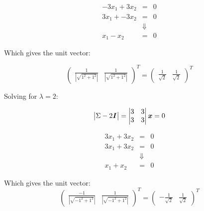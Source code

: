 \documentclass{homeworg}
\begin{document}
\begin{equation}
    \begin{matrix}
        -3x_1 + 3x_2& =& 0 \\ 
        3x_1 + -3x_2&=& 0 \\
        & \Downarrow & \\
        x_1 - x_2 &=& 0
    \end{matrix}
\end{equation}

Which gives the unit vector:

\begin{equation}
    \begin{pmatrix}
        \frac{1}{|\sqrt{1^2+1^2}|} &  \frac{1}{|\sqrt{1^2+1^2}|}
    \end{pmatrix}^T
    =
    \begin{pmatrix}
        \frac{1}{\sqrt{2}} & \frac{1}{\sqrt{2}}
    \end{pmatrix}^T
\end{equation}

Solving for $\lambda = 2$:

\begin{equation}
    \begin{vmatrix}
        \Sigma - 2\textbf{\textit{I}}
    \end{vmatrix}
    = 
    \begin{vmatrix}
        3 & 3 \\
        3 & 3
    \end{vmatrix}\bm{x}
    = 0
\end{equation}

\begin{equation}
    \begin{matrix}
        3x_1 + 3x_2& =& 0 \\ 
        3x_1 + 3x_2&=& 0 \\
        & \Downarrow & \\
        x_1 + x_2 &=& 0
    \end{matrix}
\end{equation}

Which gives the unit vector:
\begin{equation}
    \begin{pmatrix}
        \frac{-1}{|\sqrt{-1^2+1^2}|} &  \frac{1}{|\sqrt{-1^2+1^2}|}
    \end{pmatrix}^T
    =
    \begin{pmatrix}
        -\frac{1}{\sqrt{2}} & \frac{1}{\sqrt{2}}
    \end{pmatrix}^T
\end{equation}
\end{document}
